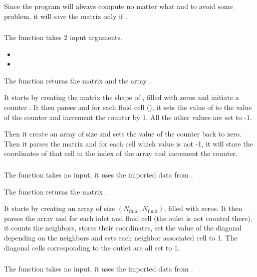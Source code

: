 Since the program will always compute  no matter what and to avoid some
problem, it will save the matrix only if .

\subsubsection{\textcolor{func}{}}
The function \textcolor{func}{} takes 2 input
arguments.
\begin{itemize}
      \item {}
      \item {} 
\end{itemize}
The function returns the matrix  and the array .

It starts by creating the matrix  the shape of , filled with zeros
and initiate a counter . It then parses  and for each fluid
cell (), it sets the value of  to the value of the
counter and increment the counter by 1. All the other values are set to -1.

Then it create an array  of size  and
sets the value of the counter back to zero. Then it parses the matrix 
and for each cell which value is not -1, it will store the coordinates of that
cell in the index  of the array  and increment the
counter.

\subsubsection{\textcolor{func}{}}
The function \textcolor{func}{} takes no input, it uses the imported data from
.

The function returns the matrix .

It starts by creating an array  of size
$(N_{\text{fluid}}, N_{\text{fluid}})$, filled with zeros. It then
parses the array  and for each inlet and fluid cell (the oulet
is not counted there), it counts the neighbors, stores their coordinates,
set the value of the diagonal depending on the neighbors and sets each
neighbor associated cell to 1. The diagonal cells corresponding to the outlet
are all set to 1.

\subsubsection{\textcolor{func}{}}
The function \textcolor{func}{} takes no input, it uses the
imported data from .

